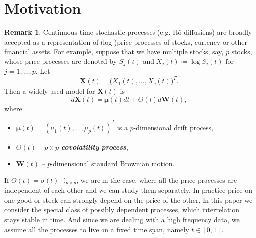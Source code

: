 \documentclass[a4paper,11pt]{book}
\theoremstyle{plain}
\theoremstyle{definition}
\newtheorem{rmrk}[thm]{Remark}
\newcommand{\define}[1]{\textit{\textbf{#1}}}
\begin{document}
	\section{Motivation}
	\begin{rmrk}
		Continuous-time stochastic processes (e.g. Itô diffusions) are broadly accepted as a representation of (log-)price processes of stocks, currency or other financial assets. For example, suppose that we have multiple stocks, say, $p$ stocks, whose price processes are denoted by $S_j(t)$ and $X_j(t) \coloneqq \log S_j(t)$ for $j = 1, \dots, p$. Let
		\[ \mathbf{X}(t) = \big(X_1(t), \dots, X_p(t)\big)^T. \]
		Then a widely used model for $\mathbf{X}(t)$ is
		\begin{equation} \label{X diffeq}
		d\mathbf{X}(t) = \boldsymbol{\mu}(t) dt + \Theta(t) d\mathbf{W}(t),
		\end{equation}
		where 
		\begin{itemize}
			\item $\boldsymbol{\mu}(t) = (\mu_1(t), \dots, \mu_p(t))^T$ is a $p$-dimensional drift process,
			\item $\Theta(t)$ -- $p \times p$ \define{covolatility process},
			\item $\mathbf{W}(t)$ -- $p$-dimensional standard Brownian motion.
		\end{itemize}
		If $\Theta(t) = \sigma(t) \cdot \mathbb{I}_{p \times p} $, we are in the case, where all the price processes are independent of each other and we can study them separately. In practice price on one good or stock can strongly depend on the price of the other. In this paper we consider the special class of possibly dependent processes, which interrelation stays stable in time. And since we are dealing with a high frequency data, we assume all the processes to live on a fixed time span, namely $t \in [0, 1]$. \\
	\end{rmrk}
\end{document}
